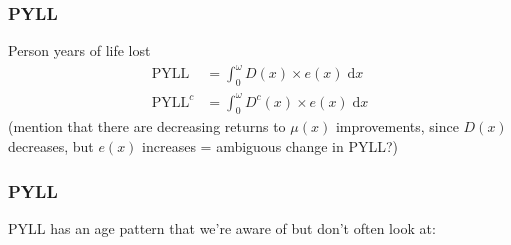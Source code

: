 \documentclass{beamer}
\newcommand{\dd}{\; \mathrm{d}}
\begin{document}
\begin{frame}
\frametitle{PYLL}
Person years of life lost
\begin{align}
\text{PYLL} &= \int_0^\omega D(x) \times e(x) \dd x \\
\text{PYLL}^c &= \int_0^\omega D^c(x) \times e(x) \dd x
\end{align}
(mention that there are decreasing returns to $\mu(x)$ improvements, since
$D(x)$ decreases, but $e(x)$ increases = ambiguous change in PYLL?)
\end{frame}


\begin{frame}
\frametitle{PYLL}
PYLL has an age pattern that we're aware of but don't often look at:
\begin{Figure}

\end{Figure}
\end{frame}

\begin{frame}

\end{frame}
\begin{frame}

\end{frame}
\end{document}
